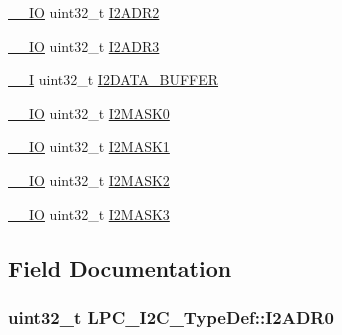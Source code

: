 \begin{DoxyCompactItemize}
\item 
\hyperlink{LPC17xx_8h_aec43007d9998a0a0e01faede4133d6be}{\+\_\+\+\_\+\+IO} uint32\+\_\+t \hyperlink{structLPC__I2C__TypeDef_a69b881b2edd482d8e33df2617592d457}{I2\+A\+D\+R2}
\item 
\hyperlink{LPC17xx_8h_aec43007d9998a0a0e01faede4133d6be}{\+\_\+\+\_\+\+IO} uint32\+\_\+t \hyperlink{structLPC__I2C__TypeDef_aadffb35682aaa5bddea920a4cb0a0246}{I2\+A\+D\+R3}
\item 
\hyperlink{LPC17xx_8h_af63697ed9952cc71e1225efe205f6cd3}{\+\_\+\+\_\+I} uint32\+\_\+t \hyperlink{structLPC__I2C__TypeDef_ab1a646fb963fbf20b91ebcdf1e70fcfa}{I2\+D\+A\+T\+A\+\_\+\+B\+U\+F\+F\+ER}
\item 
\hyperlink{LPC17xx_8h_aec43007d9998a0a0e01faede4133d6be}{\+\_\+\+\_\+\+IO} uint32\+\_\+t \hyperlink{structLPC__I2C__TypeDef_a9017881d37664444929d9e36baa65589}{I2\+M\+A\+S\+K0}
\item 
\hyperlink{LPC17xx_8h_aec43007d9998a0a0e01faede4133d6be}{\+\_\+\+\_\+\+IO} uint32\+\_\+t \hyperlink{structLPC__I2C__TypeDef_a71ee8a47fe07eb71675d3d97874e898f}{I2\+M\+A\+S\+K1}
\item 
\hyperlink{LPC17xx_8h_aec43007d9998a0a0e01faede4133d6be}{\+\_\+\+\_\+\+IO} uint32\+\_\+t \hyperlink{structLPC__I2C__TypeDef_a9a17d8876473ebcc8378e76762ad7d08}{I2\+M\+A\+S\+K2}
\item 
\hyperlink{LPC17xx_8h_aec43007d9998a0a0e01faede4133d6be}{\+\_\+\+\_\+\+IO} uint32\+\_\+t \hyperlink{structLPC__I2C__TypeDef_a3e47944a2b1d1d5666ee37fcda81519f}{I2\+M\+A\+S\+K3}
\end{DoxyCompactItemize}


\subsection{Field Documentation}
\subsubsection[{\texorpdfstring{I2\+A\+D\+R0}{I2ADR0}}]{ uint32\+\_\+t L\+P\+C\+\_\+\+I2\+C\+\_\+\+Type\+Def\+::\+I2\+A\+D\+R0}\hypertarget{structLPC__I2C__TypeDef_a2b8bd06894697a92090ebff19efc9568}{}\label{structLPC__I2C__TypeDef_a2b8bd06894697a92090ebff19efc9568}
